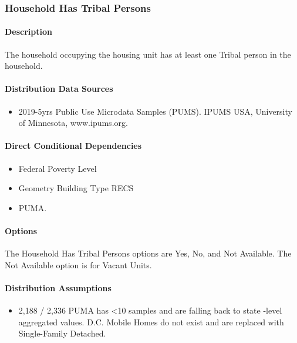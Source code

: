 \subsubsection{Household Has Tribal
Persons}\label{household_has_tribal_persons}
\paragraph{Description}
The household occupying the housing unit has at least one Tribal person
in the household.

\paragraph{Distribution Data Sources}
\begin{itemize}
\item
  2019-5yrs Public Use Microdata Samples (PUMS). IPUMS USA, University
  of Minnesota, www.ipums.org.
\end{itemize}

\paragraph{Direct Conditional Dependencies}
\begin{itemize}
    \item Federal Poverty Level
    \item Geometry Building Type RECS
    \item PUMA.
\end{itemize}

\paragraph{Options}
The Household Has Tribal Persons options are Yes, No, and Not Available. The Not Available option is for Vacant Units.

\paragraph{Distribution Assumptions}
\begin{itemize}
\item
  2,188 / 2,336 PUMA has \textless10 samples and are falling back to state
-level aggregated values. D.C. Mobile Homes do not exist and are replaced
  with Single-Family Detached.
\end{itemize}

